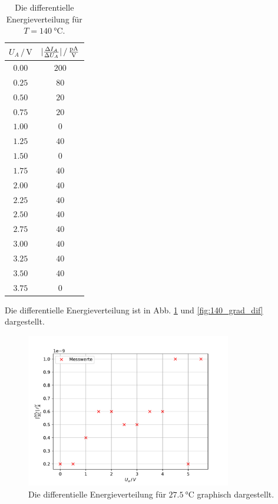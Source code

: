 \begin{table}
    \centering
    \begin{tabular}{cc}
        \toprule
        $U_A \,/\, \si{\volt}$ & $|\frac{\Delta I_A}{\Delta U_A}| \,/\, \si{\frac{\pico\ampere}{\volt}}$ \\
        \midrule
        $0.00$ & $200$ \\ 
        $0.25$ & $80$ \\ 
        $0.50$ & $20$ \\ 
        $0.75$ & $20$ \\ 
        $1.00$ & $0$ \\ 
        $1.25$ & $40$ \\ 
        $1.50$ & $0$ \\ 
        $1.75$ & $40$ \\ 
        $2.00$ & $40$ \\ 
        $2.25$ & $40$ \\ 
        $2.50$ & $40$ \\ 
        $2.75$ & $40$ \\ 
        $3.00$ & $40$ \\ 
        $3.25$ & $40$ \\ 
        $3.50$ & $40$ \\ 
        $3.75$ & $0$ \\
        \bottomrule
    \end{tabular}
    \caption{Die differentielle Energieverteilung für $T=\SI{140}{\degreeCelsius}$.}
    \label{tab:140_grad_dif}
\end{table}
Die differentielle Energieverteilung ist in Abb. \ref{fig:raumtemperatur_dif} und \ref{fig:140_grad_dif} dargestellt.
\begin{figure}
    \centering
    \includegraphics[width=0.8\textwidth]{content/data/raumtemperatur_dif.pdf}
    \caption{Die differentielle Energieverteilung für $\SI{27.5}{\degreeCelsius}$ graphisch dargestellt. \cite{matplotlib}\cite{numpy}}
    \label{fig:raumtemperatur_dif}
\end{figure}
